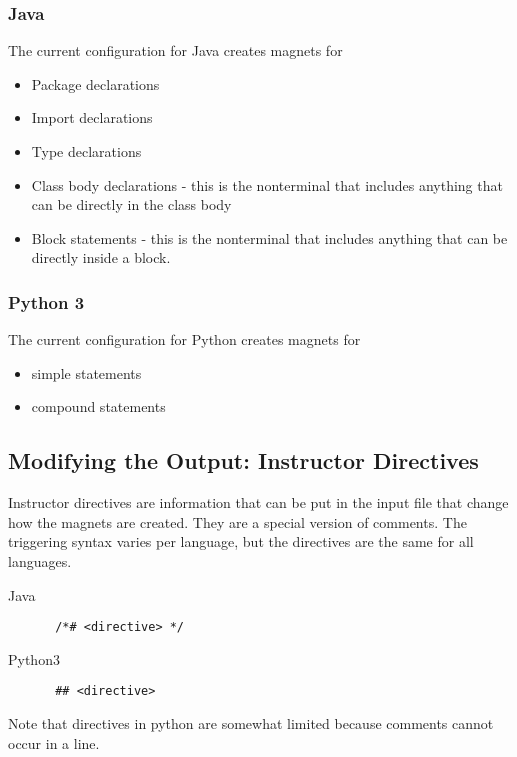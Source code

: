 \documentclass[letter,10pt]{article}
\begin{document}

\subsubsection{Java}
The current configuration for Java creates magnets for
\begin{itemize}
 \item Package declarations
 \item Import declarations
 \item Type declarations
 \item Class body declarations - this is the nonterminal that includes 
anything that can be directly in the class body
 \item Block statements - this is the nonterminal that includes 
anything that can be directly inside a block.
\end{itemize}

\subsubsection{Python 3}
The current configuration for Python creates magnets for
\begin{itemize}
 \item simple statements
 \item compound statements
\end{itemize}


\subsection{Modifying the Output: Instructor Directives}
Instructor directives are information that can be put in the input file 
that change how the magnets are created. They are a special version of 
comments. The triggering syntax varies per language, but the directives 
are the same for all languages.

\begin{description}
 \item [Java] \verb~ /*# <directive> */~
 \item [Python3] \verb~ ## <directive>~
\end{description}



Note that directives in python are somewhat limited because comments 
cannot occur in a line. 
\end{document}
